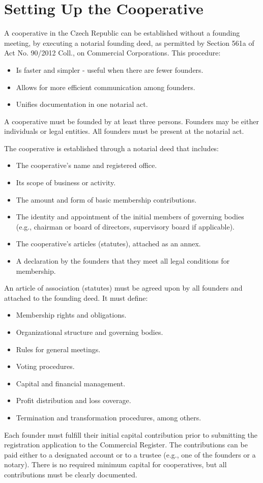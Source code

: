 \section{Setting Up the Cooperative}
A cooperative in the Czech Republic can be established without a founding meeting, by executing a notarial founding deed, as permitted by Section 561a of Act No. 90/2012 Coll., on Commercial Corporations. This procedure:
\begin{itemize}
    \item Is faster and simpler - useful when there are fewer founders.
    \item Allows for more efficient communication among founders.
    \item Unifies documentation in one notarial act.
\end{itemize}
A cooperative must be founded by at least three persons. Founders may be either individuals or legal entities. All founders must be present at the notarial act.

The cooperative is established through a notarial deed that includes:
\begin{itemize}
    \item The cooperative’s name and registered office.
    \item Its scope of business or activity.
    \item The amount and form of basic membership contributions.
    \item The identity and appointment of the initial members of governing bodies (e.g., chairman or board of directors, supervisory board if applicable).
    \item The cooperative's articles (statutes), attached as an annex.
    \item A declaration by the founders that they meet all legal conditions for membership.
\end{itemize}
An article of association (statutes) must be agreed upon by all founders and attached to the founding deed. It must define:
\begin{itemize}
    \item Membership rights and obligations.
    \item Organizational structure and governing bodies.
    \item Rules for general meetings.
    \item Voting procedures.
    \item Capital and financial management.
    \item Profit distribution and loss coverage.
    \item Termination and transformation procedures, among others.
\end{itemize}
Each founder must fulfill their initial capital contribution prior to submitting the registration application to the Commercial Register. The contributions can be paid either to a designated account or to a trustee (e.g., one of the founders or a notary). There is no required minimum capital for cooperatives, but all contributions must be clearly documented.

